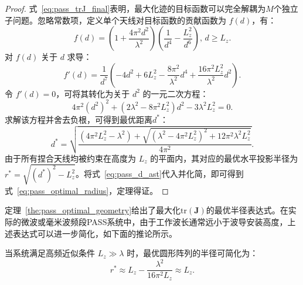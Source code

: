 \begin{proof}
	式~\eqref{eq:pass_trJ_final}表明，最大化迹的目标函数可以完全解耦为$M$个独立子问题。忽略常数项，定义单个天线对目标函数的贡献函数为 $f(d)$，有：
	\begin{equation}\label{eq:pass_func_d}
		f(d) = \left(1 + \frac{4\pi^2 d^2}{\lambda^2}\right) \left(\frac{1}{d^4} - \frac{L_z^2}{d^6}\right),\, d \ge L_z.
	\end{equation}
	对 $f(d)$ 关于 $d$ 求导：
	\begin{equation}\label{eq:pass_func_d_deriv}
		f'(d) = \frac{1}{d^7} \left( -4d^2 + 6L_z^2 - \frac{8\pi^2}{\lambda^2} d^4 + \frac{16\pi^2 L_z^2}{\lambda^2} d^2 \right).
	\end{equation}
	令 $f'(d) = 0$，可将其转化为关于 $d^2$ 的一元二次方程：
	\begin{equation}\label{eq:pass_d_quadratic}
		4\pi^2 (d^2)^2 + (2\lambda^2 - 8\pi^2 L_z^2) d^2 - 3\lambda^2 L_z^2 = 0.
	\end{equation}
	求解该方程并舍去负根，可得到最优距离$d^\ast$：
	\begin{equation}\label{eq:pass_d_ast}
		d^\ast = \sqrt{ \frac{ (4\pi^2 L_z^2 - \lambda^2) + \sqrt{ (\lambda^2 - 4\pi^2 L_z^2)^2 + 12\pi^2 \lambda^2 L_z^2 } }{4\pi^2} }.
	\end{equation}
	由于所有捏合天线均被约束在高度为 $L_z$ 的平面内，其对应的最优水平投影半径为 $r^\ast = \sqrt{(d^\ast)^2 - L_z^2}$。将式~\eqref{eq:pass_d_ast}代入并化简，即可得到式~\eqref{eq:pass_optimal_radius}，定理得证。
\end{proof}

定理~\ref{the:pass_optimal_geometry}给出了最大化$\mathrm{tr}(\bm{J})$的最优半径表达式。在实际的微波或毫米波频段PASS系统中，由于工作波长通常远小于波导安装高度，上述表达式可以进一步简化，如下面的推论所示。

\begin{corollary}\label{cor:pass_high_freq}
	当系统满足高频近似条件 $L_z \gg \lambda$ 时，最优圆形阵列的半径可简化为：
	\begin{equation}\label{eq:pass_r_ast_approx}
		r^\ast \approx L_z - \frac{\lambda^2}{16\pi^2 L_z} \approx L_z.
	\end{equation}
\end{corollary}

